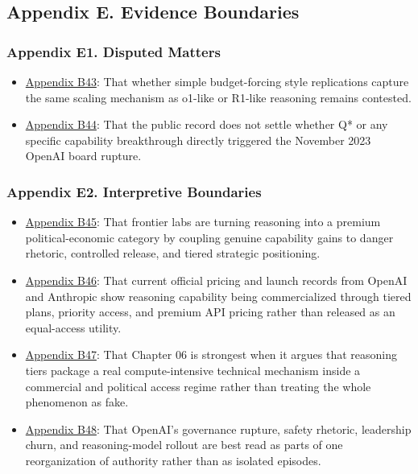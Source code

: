 \documentclass[
  american,
  11pt,
  letterpaper,
]{article}
\providecommand{\tightlist}{%
  \setlength{\itemsep}{0pt}\setlength{\parskip}{0pt}}
\begin{document}
\subsection{Appendix E. Evidence
Boundaries}\label{appendix-e.-evidence-boundaries}

\subsubsection{Appendix E1. Disputed
Matters}\label{appendix-e1-disputed-matters}

\begin{itemize}
\tightlist
\item
  \hyperref[appendix-b43-whether-simple-budget-forcing-style-replications-capture-the-same-scaling-mechani]{Appendix
  B43}: That whether simple budget-forcing style replications capture
  the same scaling mechanism as o1-like or R1-like reasoning remains
  contested.
\item
  \hyperref[appendix-b44-the-public-record-does-not-settle-whether-q-or-any-specific-capability-breakthro]{Appendix
  B44}: That the public record does not settle whether Q* or any
  specific capability breakthrough directly triggered the November 2023
  OpenAI board rupture.
\end{itemize}

\subsubsection{Appendix E2. Interpretive
Boundaries}\label{appendix-e2-interpretive-boundaries}

\begin{itemize}
\tightlist
\item
  \hyperref[appendix-b45-frontier-labs-are-turning-reasoning-into-a-premium-political-economic-category-by]{Appendix
  B45}: That frontier labs are turning reasoning into a premium
  political-economic category by coupling genuine capability gains to
  danger rhetoric, controlled release, and tiered strategic positioning.
\item
  \hyperref[appendix-b46-current-official-pricing-and-launch-records-from-openai-and-anthropic-show-reason]{Appendix
  B46}: That current official pricing and launch records from OpenAI and
  Anthropic show reasoning capability being commercialized through
  tiered plans, priority access, and premium API pricing rather than
  released as an equal-access utility.
\item
  \hyperref[appendix-b47-chapter-06-is-strongest-when-it-argues-that-reasoning-tiers-package-a-real-comput]{Appendix
  B47}: That Chapter 06 is strongest when it argues that reasoning tiers
  package a real compute-intensive technical mechanism inside a
  commercial and political access regime rather than treating the whole
  phenomenon as fake.
\item
  \hyperref[appendix-b48-openai-s-governance-rupture-safety-rhetoric-leadership-churn-and-reasoning-mod]{Appendix
  B48}: That OpenAI's governance rupture, safety rhetoric, leadership
  churn, and reasoning-model rollout are best read as parts of one
  reorganization of authority rather than as isolated episodes.
\end{itemize}
\end{document}
